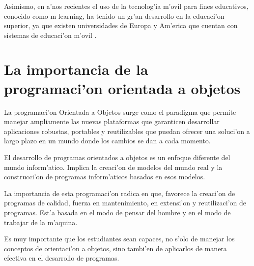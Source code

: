 Asimismo, en a'nos recientes el uso de la tecnolog'ia m'ovil para fines educativos, conocido como m-learning, ha tenido un gr'an desarrollo en la educaci'on superior, ya que existen universidades de Europa y Am'erica que cuentan con sistemas de educaci'on m'ovil \citep{traxler2007defining}.

\section{La importancia de la programaci'on orientada a objetos}
La programaci'on Orientada a Objetos surge como el paradigma que permite manejar ampliamente las nuevas plataformas que garanticen desarrollar aplicaciones robustas, portables y reutilizables que puedan ofrecer una soluci'on a largo plazo en un mundo donde los cambios se dan a cada momento.

El desarrollo de programas orientados a objetos es un enfoque diferente del mundo inform'atico. Implica la creaci'on de modelos del mundo real y la construcci'on de programas inform'aticos basados en esos modelos.

La importancia de esta programaci'on radica en que, favorece la creaci'on de programas de calidad, fuerza en mantenimiento, en extensi'on y reutilizaci'on de programas. Est'a basada en el modo de pensar del hombre y en el modo de trabajar de la m'aquina.

Es muy importante que los estudiantes sean capaces, no s'olo de manejar los conceptos de orientaci'on a objetos, sino tambi'en de aplicarlos de manera efectiva en el desarrollo de programas.